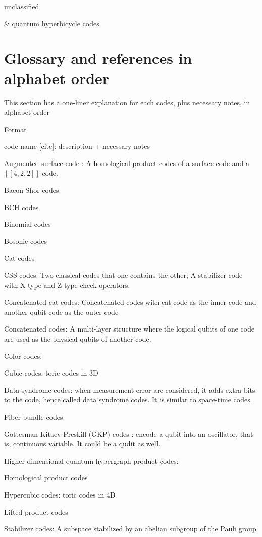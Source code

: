 \documentclass[aps,%
pra, twocolumn,%
notitlepage,longbibliography]{revtex4-2}
\begin{document}
unclassified
\begin{easylist}
  & quantum hyperbicycle codes\cite{kovalev1212quantum}
  
\end{easylist}
  
\section{Glossary and references in alphabet order}
This section has a one-liner explanation for each codes, plus
necessary notes, in alphabet order

Format

code name [cite]: description + necessary notes

Augmented surface code \cite{delfosse2020union}:
A homological product codes of a surface code and a $[[4,2,2]]$ code.

Bacon Shor codes

BCH codes

Binomial codes

Bosonic codes

Cat codes

CSS codes: Two classical codes that one contains the other; A
stabilizer code with X-type and Z-type check operators.

Concatenated cat codes: Concatenated codes with cat code as the inner
code and another qubit code as the outer code

Concatenated codes: A multi-layer structure where the logical qubits
of one code are used as the physical qubits of another code.


Color codes:

Cubic codes: toric codes in 3D

Data syndrome codes: when measurement error are considered, it adds
extra bits to the code, hence called data syndrome codes. It is
similar to space-time codes.

Fiber bundle codes

Gottesman-Kitaev-Preskill (GKP) codes \cite{gottesman2001encoding}: encode a qubit into an
oscillator, that is, continuous variable. It could be a qudit as well.


Higher-dimensional quantum hypergraph product codes:

Homological product codes

Hypercubic codes: toric codes in 4D


Lifted product codes \cite{panteleev2020quantum}

Stabilizer codes: A subspace stabilized by an abelian subgroup of the
Pauli group.
\end{document}
